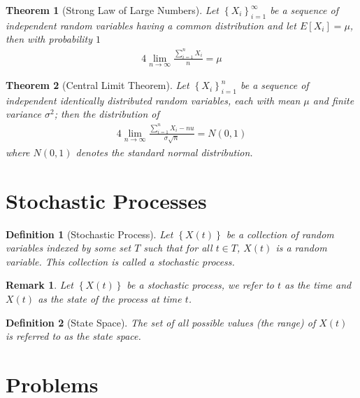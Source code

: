 \documentclass[11pt, oneside]{book}   	%
\newtheorem{definition}{Definition}[chapter]
\newtheorem{remark}{Remark}[chapter]
\newtheorem{theorem}{Theorem}[chapter]
\newcommand{\set}[1]{\left\{#1\right\}}
\begin{document}
\begin{theorem}[Strong Law of Large Numbers]
Let $\set{X_i}_{i=1}^\infty$ be a sequence of independent random variables having a common distribution and let $E[X_i]=\mu$, then with probability $1$
	\begin{alignat}{4}
		\lim_{n\to\infty}\frac{\sum_{i=1}^n X_i}{n} = \mu
	\end{alignat}
\end{theorem}

\begin{theorem}[Central Limit Theorem]
	Let $\set{X_i}_{i=1}^n$ be a sequence of independent identically distributed random variables, each with mean $\mu$ and finite variance $\sigma^2$; then the distribution of 
	\begin{alignat}{4}
		\lim_{n\to\infty}\frac{\sum_{i=1}^n X_i - nu}{\sigma\sqrt{n}} = N(0, 1)
	\end{alignat}
	where $N(0, 1)$ denotes the standard normal distribution. 
\end{theorem}	

\section{Stochastic Processes}

\begin{definition}[Stochastic Process]
	Let $\set{X(t)}$ be a collection of random variables indexed by some set $T$ such that for all $t\in T$, $X(t)$ is a random variable. This collection is called a stochastic process.
\end{definition}

\begin{remark}
	Let $\set{X(t)}$ be a stochastic process, we refer to $t$ as the time and $X(t)$ as the state of the process at time $t$. 
\end{remark}

\begin{definition}[State Space]
	The set of all possible values (the range) of $X(t)$ is referred to as the state space. 
\end{definition}	

\section{Problems}
\end{document}
